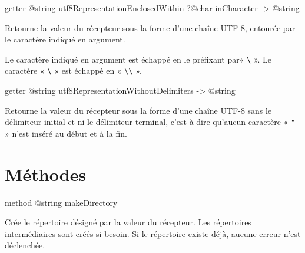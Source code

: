 
\begin{galgas3box}
getter @string utf8RepresentationEnclosedWithin ?@char inCharacter -> @string
\end{galgas3box}

Retourne la valeur du récepteur sous la forme d'une chaîne UTF-8, entourée par le caractère indiqué en argument.

Le caractère indiqué en argument est échappé en le préfixant par« \texttt{\textbackslash} ». Le caractère « \texttt{\textbackslash} » est échappé en « \texttt{\textbackslash\textbackslash} ».










\begin{galgas3box}
getter @string utf8RepresentationWithoutDelimiters -> @string
\end{galgas3box}

Retourne la valeur du récepteur sous la forme d'une chaîne UTF-8 sans le délimiteur initial et ni le délimiteur terminal, c'est-à-dire qu'aucun caractère « \texttt{"} » n'est inséré au début et à la fin.














\section{Méthodes}






\begin{galgas3box}
method @string makeDirectory
\end{galgas3box}

Crée le répertoire désigné par la valeur du récepteur. Les répertoires intermédiaires sont créés si besoin. Si le répertoire existe déjà, aucune erreur n'est déclenchée.







